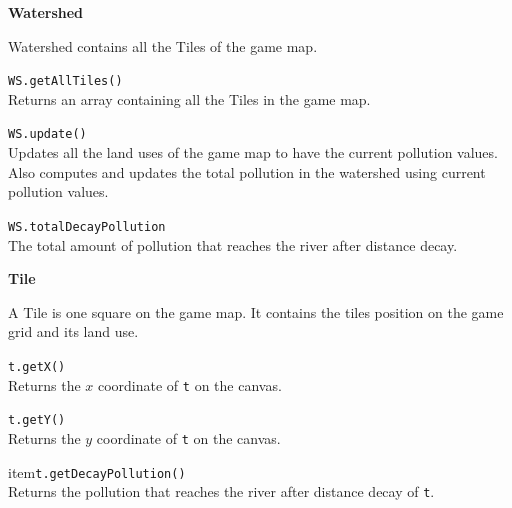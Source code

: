 \documentclass[10pt,twocolumn]{article}
\begin{document}
\thispagestyle{empty}



\noindent\textbf{\large Watershed}
\begin{description}

\item{}
Watershed contains all the Tiles of the game map.

\item{\texttt{WS.getAllTiles()}}\ \\[.25em]
%
  Returns an array containing all the Tiles in the game map.

\item{\texttt{WS.update()}}\ \\[.25em]
%
  Updates all the land uses of the game map to have the current pollution values.
  Also computes and updates the total pollution in the watershed using current pollution values.

\item{\texttt{WS.totalDecayPollution}}\ \\[.25em]
%
  The total amount of pollution that reaches the river after distance decay.

\end{description}

\noindent\textbf{\large Tile}
\begin{description}

\item{}
A Tile is one square on the game map. It contains the tiles position on the game grid and its land use. 

\item{\texttt{t.getX()}}\ \\[.25em]
%
  Returns the $x$ coordinate of \texttt{t} on the canvas. 

\item{\texttt{t.getY()}}\ \\[.25em]
%
  Returns the $y$ coordinate of \texttt{t} on the canvas. 

item{\texttt{t.getDecayPollution()}}\ \\[.25em]
%
  Returns the pollution that reaches the river after distance decay of \texttt{t}.

\end{description}
\end{document}
